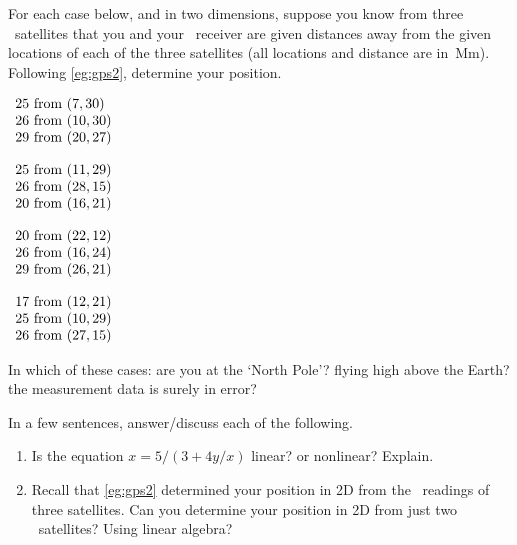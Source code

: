 \begin{exercise} \label{ex:gps2} 
For each case below, and in two dimensions, suppose you know from three \gps\ satellites that you and your \gps\ receiver are given distances away from the given locations of each of the three satellites (all locations and distance are in~Mm).  
Following \cref{eg:gps2}, determine your position.  
\begin{Parts}
\item \(\begin{array}{r@{\text{ from }}l}
25&(7,30)\\26&(10,30)\\29&(20,27)
\end{array}\)

\item \(\begin{array}{r@{\text{ from }}l}
25&(11,29)\\26&(28,15)\\20&(16,21)
\end{array}\)

\item \(\begin{array}{r@{\text{ from }}l}
20&(22,12)\\26&(16,24)\\29&(26,21)
\end{array}\)

\item \(\begin{array}{r@{\text{ from }}l}
17&(12,21)\\25&(10,29)\\26&(27,15)
\end{array}\)

\end{Parts}
In which of these cases: are you at the `North Pole'?  flying high above the Earth?  the measurement data is surely in error?
\end{exercise}



\begin{exercise}  
In a few sentences, answer\slash discuss each of the following.
\begin{enumerate}
\item Is the equation \(x=5/(3+4y/x)\) linear? or nonlinear? Explain.

\item Recall that \cref{eg:gps2} determined your position in 2D from the \gps\ readings of three satellites.  Can you determine your position in 2D from just two \gps\ satellites?  Using linear algebra?

\end{enumerate}
\end{exercise}

\begin{comment}%
why, what caused X?
how did X occur?
what-if? what-if-not?
how does X compare with Y?
what is the evidence for X?
why is X important?
\end{comment}









